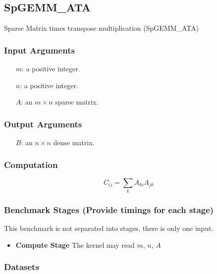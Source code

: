 \documentclass{article}
\begin{document}
\subsection{SpGEMM\_ATA}
Sparse Matrix times transpose multiplication (SpGEMM\_ATA)
\subsubsection{Input Arguments}

\begin{itemize}
	\item[$m$:] a positive integer.
	\item[$n$:] a positive integer.
	\item[$A$:] an $m \times n$ sparse matrix.
\end{itemize}

\subsubsection{Output Arguments}

\begin{itemize}
	\item[$B$:] an $n \times n$ dense matrix.
\end{itemize}

\subsubsection{Computation}

$$C_{ij} = \sum_{k}A_{ki}A_{jk}$$

\subsubsection{Benchmark Stages (Provide timings for each stage)}

This benchmark is not separated into stages, there is only one input.

\begin{itemize}
\item \textbf{Compute Stage}
	The kernel may read $m$, $n$, $A$
\end{itemize}

\subsubsection{Datasets}
\end{document}
